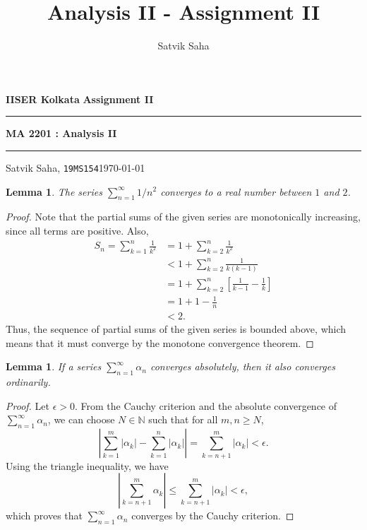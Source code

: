 \documentclass[10pt]{article}
\title{Analysis II - Assignment II}
\author{Satvik Saha}
\date{}
\def\N{\mathbb{N}}
\newtheorem{lemma}[theorem]{Lemma}
\begin{document}
    \par\textbf{IISER Kolkata} \hfill \textbf{Assignment II}
    \vspace{3pt}
    \hrule
    \vspace{3pt}
    \begin{center}
            \LARGE{\textbf{MA 2201 : Analysis II}}
    \end{center}
    \vspace{3pt}
    \hrule
    \vspace{3pt}
    Satvik Saha, \texttt{19MS154}\hfill\today
    \vspace{20pt}

    \begin{lemma}
        The series $\sum_{n = 1}^\infty 1 /n^2$ converges to a real number between
        $1$ and $2$.
    \end{lemma}
    \begin{proof}
        Note that the partial sums of the given series are monotonically increasing,
        since all terms are positive. Also,
        \begin{align*}
            S_n = \sum_{k = 1}^n \frac{1}{k^2} &= 1 + \sum_{k = 2}^n
            \frac{1}{k^2} \\
            &< 1 + \sum_{k = 2}^n \frac{1}{k(k - 1)} \\
            &= 1 + \sum_{k = 2}^n \left[ \frac{1}{k - 1} - \frac{1}{k} \right] \\
            &= 1 + 1 - \frac{1}{n} \\
            & < 2.
        \end{align*}
        Thus, the sequence of partial sums of the given series is bounded above,
        which means that it must converge by the monotone convergence theorem.
    \end{proof}

    \begin{lemma}
        If a series $\sum_{n = 1}^\infty \alpha_n$ converges absolutely, then it 
        also converges ordinarily.
    \end{lemma}
    \begin{proof}
        Let $\epsilon > 0$. From the Cauchy criterion and the absolute convergence
        of $\sum_{n = 1}^\infty \alpha_n$, we can choose $N \in \N$
        such that for all $m, n \geq N$, \[
            \left|\sum_{k = 1}^m |\alpha_k| - \sum_{k = 1}^n |\alpha_k|
            \right| = \sum_{k = n + 1}^m |\alpha_k| < \epsilon.
        \] Using the triangle inequality, we have \[
            \left|\sum_{k = n + 1}^m \alpha_k \right| \leq \sum_{k = n + 1}^m
            |\alpha_k| < \epsilon,
        \] which proves that $\sum_{n = 1}^\infty \alpha_n$ converges by the Cauchy
        criterion.
    \end{proof}
\end{document}
